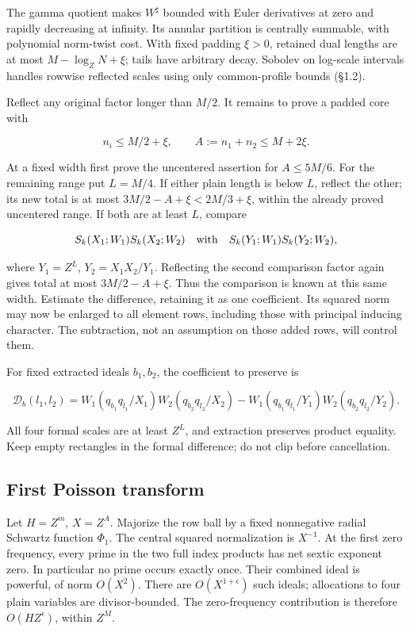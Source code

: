 \documentclass[11pt,a4paper]{article}
\begin{document}
The gamma quotient makes \(W^\sharp\) bounded with Euler derivatives at zero and rapidly decreasing at infinity. Its annular partition is centrally summable, with polynomial norm-twist cost. With fixed padding \(\xi>0\), retained dual lengths are at most \(M-\log_ZN+\xi\); tails have arbitrary decay. Sobolev on log-scale intervals handles rowwise reflected scales using only common-profile bounds (§1.2).

Reflect any original factor longer than \(M/2\). It remains to prove a padded core with

\[
n_i\le M/2+\xi,\qquad A:=n_1+n_2\le M+2\xi.
\tag{D.8}\label{eq:D.8}
\]

At a fixed width first prove the uncentered assertion for \(A\le5M/6\). For the remaining range put \(L=M/4\). If either plain length is below \(L\), reflect the other; its new total is at most \(3M/2-A+\xi<2M/3+\xi\), within the already proved uncentered range. If both are at least \(L\), compare

\[
S_k(X_1;W_1)S_k(X_2;W_2)
\quad\hbox{with}\quad
S_k(Y_1;W_1)S_k(Y_2;W_2),
\]

where \(Y_1=Z^L\), \(Y_2=X_1X_2/Y_1\). Reflecting the second comparison factor again gives total at most \(3M/2-A+\xi\). Thus the comparison is known at this same width. Estimate the difference, retaining it as one coefficient. Its squared norm may now be enlarged to all element rows, including those with principal inducing character. The subtraction, not an assumption on those added rows, will control them.

For fixed extracted ideals \(b_1,b_2\), the coefficient to preserve is

\[
\mathcal D_b(l_1,l_2)=
W_1(q_{b_1}q_{l_1}/X_1)W_2(q_{b_2}q_{l_2}/X_2)
-W_1(q_{b_1}q_{l_1}/Y_1)W_2(q_{b_2}q_{l_2}/Y_2).
\tag{D.9}\label{eq:D.9}
\]

All four formal scales are at least \(Z^L\), and extraction preserves product equality. Keep empty rectangles in the formal difference; do not clip before cancellation.

\subsection{First Poisson transform}\label{sec:D.4}

Let \(H=Z^m\), \(X=Z^A\). Majorize the row ball by a fixed nonnegative radial Schwartz function \(\Phi_1\). The central squared normalization is \(X^{-1}\). At the first zero frequency, every prime in the two full index products has net sextic exponent zero. In particular no prime occurs exactly once. Their combined ideal is powerful, of norm \(O(X^2)\). There are \(O(X^{1+\epsilon})\) such ideals; allocations to four plain variables are divisor-bounded. The zero-frequency contribution is therefore \(O(HZ^\epsilon)\), within \(Z^M\).
\end{document}
